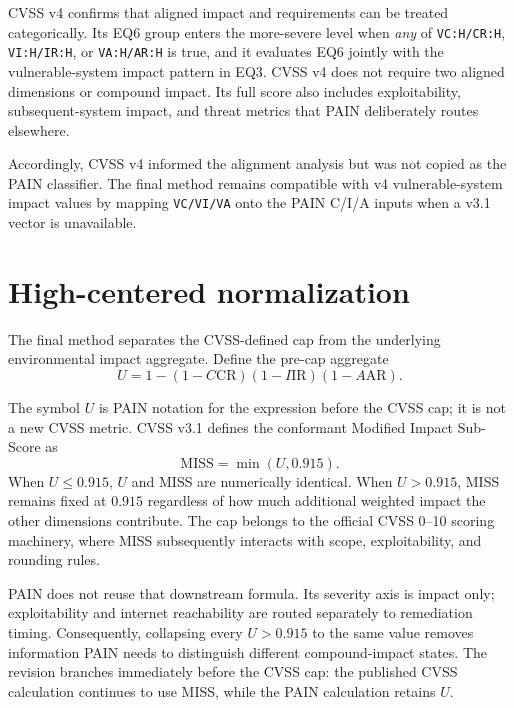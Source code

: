 \documentclass[11pt]{article}
\newcommand{\code}[1]{\texttt{#1}}
\begin{document}
CVSS v4 confirms that aligned impact and requirements can be treated categorically.
Its EQ6 group enters the more-severe level when \emph{any} of
\code{VC:H/CR:H}, \code{VI:H/IR:H}, or \code{VA:H/AR:H} is true, and it evaluates
EQ6 jointly with the vulnerable-system impact pattern in EQ3. CVSS v4 does not
require two aligned dimensions or compound impact. Its full score also includes
exploitability, subsequent-system impact, and threat metrics that PAIN deliberately
routes elsewhere.

Accordingly, CVSS v4 informed the alignment analysis but was not copied as the
PAIN classifier. The final method remains compatible with v4 vulnerable-system
impact values by mapping \code{VC/VI/VA} onto the PAIN C/I/A inputs when a v3.1
vector is unavailable.

\section{High-centered normalization}
\label{sec:normalization}

The final method separates the CVSS-defined cap from the underlying environmental
impact aggregate. Define the pre-cap aggregate
\begin{equation}
U=1-(1-C\mathrm{CR})(1-I\mathrm{IR})(1-A\mathrm{AR}).
\label{eq:aggregate}
\end{equation}

The symbol $U$ is PAIN notation for the expression before the CVSS cap; it is not a
new CVSS metric. CVSS v3.1 defines the conformant Modified Impact Sub-Score as
\begin{equation}
\mathrm{MISS}=\min(U,0.915).
\label{eq:miss-boundary}
\end{equation}
When $U\le0.915$, $U$ and MISS are numerically identical. When $U>0.915$, MISS
remains fixed at $0.915$ regardless of how much additional weighted impact the
other dimensions contribute. The cap belongs to the official CVSS 0--10 scoring
machinery, where MISS subsequently interacts with scope, exploitability, and
rounding rules.

PAIN does not reuse that downstream formula. Its severity axis is impact only;
exploitability and internet reachability are routed separately to remediation
timing. Consequently, collapsing every $U>0.915$ to the same value removes
information PAIN needs to distinguish different compound-impact states. The
revision branches immediately before the CVSS cap: the published CVSS calculation
continues to use MISS, while the PAIN calculation retains $U$.
\end{document}
